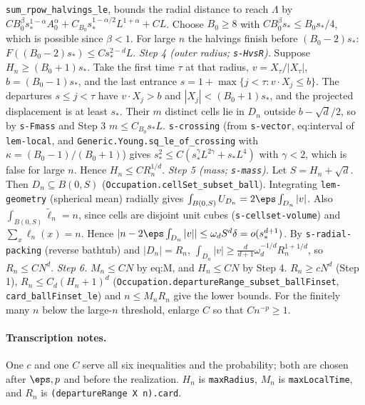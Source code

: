 \texttt{sum\_rpow\_halvings\_le}, bounds the radial distance to reach $\Lambda$ by
$CB_0^\beta s_*^{1-\alpha}A_0^\alpha+C_{B_0}s_*^{1-\alpha/2}L^{1+\alpha}+CL$. Choose $B_0\ge8$ with
$CB_0^\beta s_*\le B_0s_*/4$, which is possible since $\beta<1$. For large $n$ the halvings finish
before $(B_0-2)s_*$: $F((B_0-2)s_*)\le Cs_*^{2-d}L$.
\emph{Step 4 (outer radius; \texttt{s-HvsR}).} Suppose $H_n\ge(B_0+1)s_*$. Take the first time
$\tau$ at that radius, $v=X_\tau/|X_\tau|$, $b=(B_0-1)s_*$, and the last entrance
$s=1+\max\{j<\tau:v\cdot X_j\le b\}$. The departures $s\le j<\tau$ have $v\cdot X_j>b$ and
$|X_j|<(B_0+1)s_*$, and the projected displacement is at least $s_*$. Their $m$ distinct cells lie
in $D_n$ outside $b-\sqrt d/2$, so by \texttt{s-Fmass} and Step 3 $m\le C_{B_0}s_*L$.
\texttt{s-crossing} (from \texttt{s-vector}, eq:interval of \texttt{lem-local}, and
\texttt{Generic.Young.sq\_le\_of\_crossing} with $\kappa=(B_0-1)/(B_0+1)$) gives
$s_*^2\le C(s_*^\gamma L^{2\gamma}+s_*L^4)$ with $\gamma<2$, which is false for large $n$. Hence
$H_n\le CR_n^{1/d}$.
\emph{Step 5 (mass; \texttt{s-mass}).} Let $S=H_n+\sqrt d$. Then $D_n\subseteq B(0,S)$
(\texttt{Occupation.cellSet\_subset\_ball}). Integrating \texttt{lem-geometry} (spherical mean)
radially gives $\int_{B(0,S)}U_{D_n}=2\eps\int_{D_n}|v|$. Also $\int_{B(0,S)}\widetilde\ell_n=n$, since
cells are disjoint unit cubes (\texttt{s-cellset-volume}) and $\sum_x\ell_n(x)=n$. Hence
$|n-2\eps\int_{D_n}|v||\le\omega_dS^d\delta=o(s_*^{d+1})$. By \texttt{s-radial-packing} (reverse
bathtub) and $|D_n|=R_n$, $\int_{D_n}|v|\ge\frac d{d+1}\omega_d^{-1/d}R_n^{1+1/d}$, so $R_n\le CN^d$.
\emph{Step 6.} $M_n\le CN$ by eq:M, and $H_n\le CN$ by Step 4. $R_n\ge cN^d$ (Step 1),
$R_n\le C_d(H_n+1)^d$ (\texttt{Occupation.departureRange\_subset\_ballFinset},
\texttt{card\_ballFinset\_le}) and $n\le M_nR_n$ give the lower bounds. For the finitely many $n$
below the large-$n$ threshold, enlarge $C$ so that $Cn^{-p}\ge1$.
\paragraph{Transcription notes.} One $c$ and one $C$ serve all six inequalities and the
probability; both are chosen after $\eps,p$ and before the realization. $H_n$ is
\texttt{maxRadius}, $M_n$ is \texttt{maxLocalTime}, and $R_n$ is \texttt{(departureRange X n).card}.
